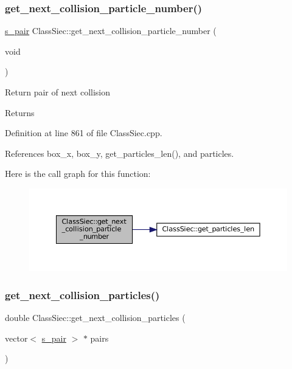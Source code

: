 \subsubsection{\texorpdfstring{get\+\_\+next\+\_\+collision\+\_\+particle\+\_\+number()}{get\_next\_collision\_particle\_number()}}
{\footnotesize\ttfamily \mbox{\hyperlink{structs__pair}{s\+\_\+pair}} Class\+Siec\+::get\+\_\+next\+\_\+collision\+\_\+particle\+\_\+number (\begin{DoxyParamCaption}\item[{void}]{ }\end{DoxyParamCaption})}

Return pair of next collision \begin{DoxyReturn}{Returns}

\end{DoxyReturn}


Definition at line 861 of file Class\+Siec.\+cpp.



References box\+\_\+x, box\+\_\+y, get\+\_\+particles\+\_\+len(), and particles.

Here is the call graph for this function\+:
\nopagebreak
\begin{figure}[H]
\begin{center}
\leavevmode
\includegraphics[width=350pt]{classClassSiec_a1f8a44832453567a2eeed85fe038ca01_cgraph}
\end{center}
\end{figure}
\mbox{\label{classClassSiec_a654072dec38aee93903bdce321890a80}} 
\subsubsection{\texorpdfstring{get\+\_\+next\+\_\+collision\+\_\+particles()}{get\_next\_collision\_particles()}}
{\footnotesize\ttfamily double Class\+Siec\+::get\+\_\+next\+\_\+collision\+\_\+particles (\begin{DoxyParamCaption}\item[{vector$<$ \mbox{\hyperlink{structs__pair}{s\+\_\+pair}} $>$ $\ast$}]{pairs }\end{DoxyParamCaption})}


